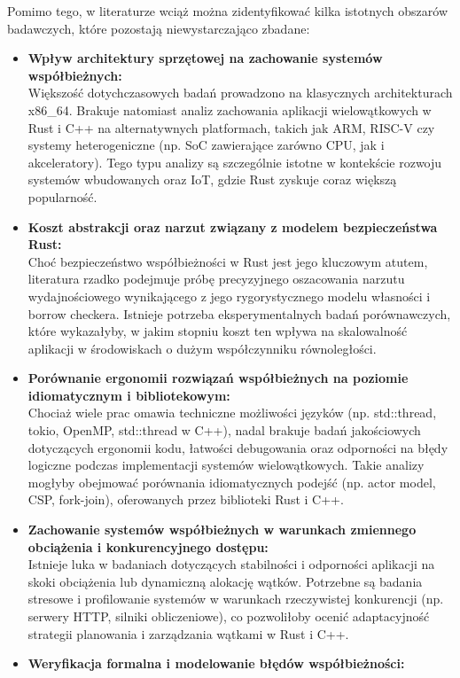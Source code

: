 Pomimo tego, w literaturze wciąż można zidentyfikować kilka istotnych obszarów badawczych, które pozostają niewystarczająco zbadane:
\begin{itemize}
    \item \textbf{Wpływ architektury sprzętowej na zachowanie systemów współbieżnych:}\\
    Większość dotychczasowych badań prowadzono na klasycznych architekturach x86\_64. Brakuje natomiast analiz zachowania aplikacji wielowątkowych w Rust i C++ na alternatywnych platformach, takich jak ARM, RISC-V czy systemy heterogeniczne (np. SoC zawierające zarówno CPU, jak i akceleratory). Tego typu analizy są szczególnie istotne w kontekście rozwoju systemów wbudowanych oraz IoT, gdzie Rust zyskuje coraz większą popularność.
    \item \textbf{Koszt abstrakcji oraz narzut związany z modelem bezpieczeństwa Rust:}\\
    Choć bezpieczeństwo współbieżności w Rust jest jego kluczowym atutem, literatura rzadko podejmuje próbę precyzyjnego oszacowania narzutu wydajnościowego wynikającego z jego rygorystycznego modelu własności i borrow checkera. Istnieje potrzeba eksperymentalnych badań porównawczych, które wykazałyby, w jakim stopniu koszt ten wpływa na skalowalność aplikacji w środowiskach o dużym współczynniku równoległości.
    \item \textbf{Porównanie ergonomii rozwiązań współbieżnych na poziomie idiomatycznym i bibliotekowym:}\\
    Chociaż wiele prac omawia techniczne możliwości języków (np. std::thread, tokio, OpenMP, std::thread w C++), nadal brakuje badań jakościowych dotyczących ergonomii kodu, łatwości debugowania oraz odporności na błędy logiczne podczas implementacji systemów wielowątkowych. Takie analizy mogłyby obejmować porównania idiomatycznych podejść (np. actor model, CSP, fork-join), oferowanych przez biblioteki Rust i C++.
    \item \textbf{Zachowanie systemów współbieżnych w warunkach zmiennego obciążenia i konkurencyjnego dostępu:}\\
    Istnieje luka w badaniach dotyczących stabilności i odporności aplikacji na skoki obciążenia lub dynamiczną alokację wątków. Potrzebne są badania stresowe i profilowanie systemów w warunkach rzeczywistej konkurencji (np. serwery HTTP, silniki obliczeniowe), co pozwoliłoby ocenić adaptacyjność strategii planowania i zarządzania wątkami w Rust i C++.
    \item \textbf{Weryfikacja formalna i modelowanie błędów współbieżności:}\\

\end{itemize}
